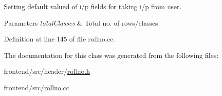 Setting default valued of i/p fields for taking i/p from user. 


\begin{DoxyParams}{Parameters}
{\em total\-Classes} & Total no. of rows/classes \\
\hline
\end{DoxyParams}


Definition at line 145 of file rollno.\-cc.



The documentation for this class was generated from the following files\-:\begin{DoxyCompactItemize}
\item 
frontend/src/header/\hyperlink{rollno_8h}{rollno.\-h}\item 
frontend/src/\hyperlink{rollno_8cc}{rollno.\-cc}\end{DoxyCompactItemize}
